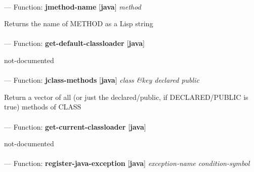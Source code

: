 \paragraph{}
\label{JAVA:JMETHOD-NAME}
--- Function: \textbf{jmethod-name} [\textbf{java}] \textit{method}

\begin{adjustwidth}{5em}{5em}
Returns the name of METHOD as a Lisp string
\end{adjustwidth}

\paragraph{}
\label{JAVA:GET-DEFAULT-CLASSLOADER}
--- Function: \textbf{get-default-classloader} [\textbf{java}] \textit{}

\begin{adjustwidth}{5em}{5em}
not-documented
\end{adjustwidth}

\paragraph{}
\label{JAVA:JCLASS-METHODS}
--- Function: \textbf{jclass-methods} [\textbf{java}] \textit{class \&key declared public}

\begin{adjustwidth}{5em}{5em}
Return a vector of all (or just the declared/public, if DECLARED/PUBLIC is true) methods of CLASS
\end{adjustwidth}

\paragraph{}
\label{JAVA:GET-CURRENT-CLASSLOADER}
--- Function: \textbf{get-current-classloader} [\textbf{java}] \textit{}

\begin{adjustwidth}{5em}{5em}
not-documented
\end{adjustwidth}

\paragraph{}
\label{JAVA:REGISTER-JAVA-EXCEPTION}
--- Function: \textbf{register-java-exception} [\textbf{java}] \textit{exception-name condition-symbol}

